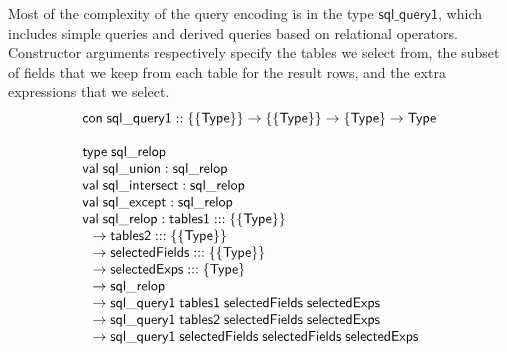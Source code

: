 \documentclass{article}
\newcommand{\mt}[1]{\mathsf{#1}}
\begin{document}
Most of the complexity of the query encoding is in the type $\mt{sql\_query1}$, which includes simple queries and derived queries based on relational operators.  Constructor arguments respectively specify the tables we select from, the subset of fields that we keep from each table for the result rows, and the extra expressions that we select.
$$\begin{array}{l}
  \mt{con} \; \mt{sql\_query1} :: \{\{\mt{Type}\}\} \to \{\{\mt{Type}\}\} \to \{\mt{Type}\} \to \mt{Type} \\
  \\
  \mt{type} \; \mt{sql\_relop} \\
  \mt{val} \; \mt{sql\_union} : \mt{sql\_relop} \\
  \mt{val} \; \mt{sql\_intersect} : \mt{sql\_relop} \\
  \mt{val} \; \mt{sql\_except} : \mt{sql\_relop} \\
  \mt{val} \; \mt{sql\_relop} : \mt{tables1} ::: \{\{\mt{Type}\}\} \\
  \hspace{.1in} \to \mt{tables2} ::: \{\{\mt{Type}\}\} \\
  \hspace{.1in} \to \mt{selectedFields} ::: \{\{\mt{Type}\}\} \\
  \hspace{.1in} \to \mt{selectedExps} ::: \{\mt{Type}\} \\
  \hspace{.1in} \to \mt{sql\_relop} \\
  \hspace{.1in} \to \mt{sql\_query1} \; \mt{tables1} \; \mt{selectedFields} \; \mt{selectedExps} \\
  \hspace{.1in} \to \mt{sql\_query1} \; \mt{tables2} \; \mt{selectedFields} \; \mt{selectedExps} \\
  \hspace{.1in} \to \mt{sql\_query1} \; \mt{selectedFields} \; \mt{selectedFields} \; \mt{selectedExps}
\end{array}$$
\end{document}
